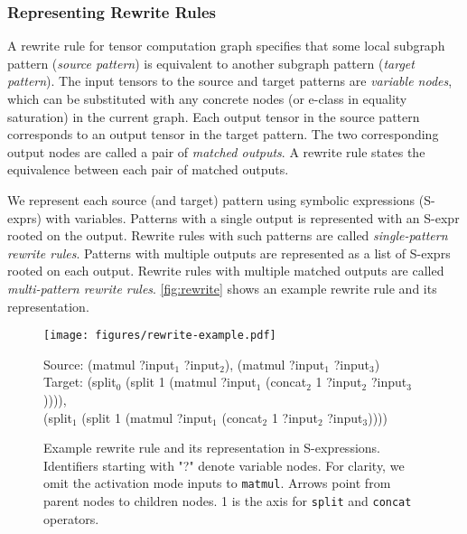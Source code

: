 \subsubsection{Representing Rewrite Rules}
\label{sec:rewrite}

A rewrite rule for tensor computation graph specifies that some local subgraph pattern (\textit{source pattern}) is equivalent to another subgraph pattern (\textit{target pattern}).
The input tensors to the source and target patterns are \textit{variable nodes}, which can be substituted with any concrete nodes (or e-class in equality saturation) in the current graph.
Each output tensor in the source pattern corresponds to an output tensor in the target pattern.
The two corresponding output nodes are called a pair of \textit{matched outputs}.
A rewrite rule states the equivalence between each pair of matched outputs.

We represent each source (and target) pattern using symbolic expressions (S-exprs) with variables.
Patterns with a single output is represented with an S-expr rooted on the output.
Rewrite rules with such patterns are called \textit{single-pattern rewrite rules}.
Patterns with multiple outputs are represented as a list of S-exprs rooted on each output.
Rewrite rules with multiple matched outputs are called \textit{multi-pattern rewrite rules}.
\autoref{fig:rewrite} shows an example rewrite rule and its representation.

\begin{figure}[t]
    \centering
    \texttt{[image: figures/rewrite-example.pdf]}
    \begin{scriptsize}
    Source: (matmul ?input$_1$ ?input$_2$), (matmul ?input$_1$ ?input$_3$) \\
    Target: (split$_0$ (split 1 (matmul ?input$_1$ (concat$_2$ 1 ?input$_2$ ?input$_3$)))), \\
    (split$_1$ (split 1 (matmul ?input$_1$ (concat$_2$ 1 ?input$_2$ ?input$_3$))))
    \end{scriptsize}
    \caption{
    Example rewrite rule and its representation in S-expressions.
    Identifiers starting with "?" denote variable nodes.
    For clarity, we omit the activation mode inputs to \texttt{matmul}.
    Arrows point from parent nodes to children nodes.
    1 is the axis for \texttt{split} and \texttt{concat} operators.
    }
    \label{fig:rewrite}
\end{figure}

